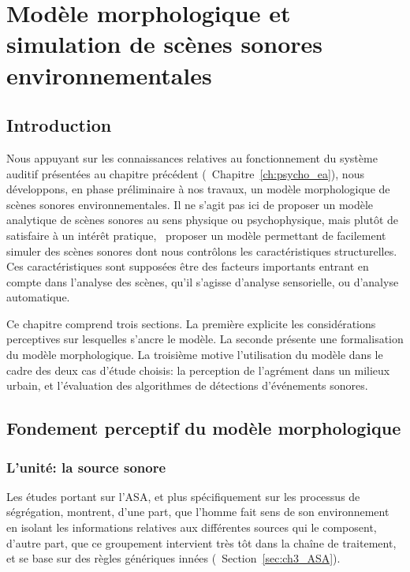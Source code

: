 \chapter[Modèle et simulation]{Modèle morphologique et simulation de scènes sonores environnementales}\label{ch:psycho_model} 

\section{Introduction}

Nous appuyant sur les connaissances relatives au fonctionnement du système auditif présentées au chapitre précédent (\cf~Chapitre~\ref{ch:psycho_ea}), nous développons, en phase préliminaire à nos travaux, un modèle morphologique de scènes sonores environnementales. Il ne s'agit pas ici de proposer un modèle analytique de scènes sonores au sens physique ou psychophysique, mais plutôt de satisfaire à un intérêt pratique, \ie~proposer un modèle permettant de facilement simuler des scènes sonores dont nous contrôlons les caractéristiques structurelles. Ces caractéristiques sont supposées être des facteurs importants entrant en compte dans l'analyse des scènes, qu'il s'agisse d'analyse sensorielle, ou d'analyse automatique.


Ce chapitre comprend trois sections. La première explicite les considérations perceptives sur lesquelles s'ancre le modèle. La seconde présente une formalisation du modèle morphologique. La troisième motive l'utilisation du modèle dans le cadre des deux cas d'étude choisis: la perception de l'agrément dans un milieux urbain, et l'évaluation des algorithmes de détections d'événements sonores.

\section{Fondement perceptif du modèle morphologique}
\label{sec:ch4_model}

\subsection{L'unité: la source sonore}

Les études portant sur l'ASA, et plus spécifiquement sur les processus de ségrégation, montrent, d'une part, que l'homme fait sens de son environnement en isolant les informations relatives aux différentes sources qui le composent, d'autre part, que ce groupement intervient très tôt dans la chaîne de traitement, et se base sur des règles génériques innées (\cf~Section~\ref{sec:ch3_ASA}).

